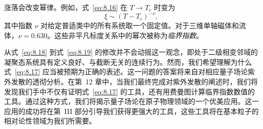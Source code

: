 涨落会改变幂律。例如，式~\eqref{eq:8.16} 在 $T \to T_c$ 时变为
\begin{equation}
  \xi \sim (T-T_c)^{-\nu},
  \label{eq:8.19}
\end{equation}
其中指数 $\nu$ 对给定普适类中的所有系统取一个固定值。对于三维单轴磁体和流体，$\nu = 0.630$。这些非平凡标度关系中的幂次被称为\emph{临界指数}。

从式~\eqref{eq:8.18} 到式~\eqref{eq:8.19} 的修改并不会动摇这一观念，即处于二级相变邻域的凝聚态系统具有定义良好、与截断无关的连续行为。然而，我们希望理解为什么式~\eqref{eq:8.17} 应当被预期为正确的表述。这一问题的答案将来自对相应量子场论紫外发散的透彻分析。在第~12 章中，当我们最终完成对紫外发散的阐述时，我们将发现我们手中不仅有证明式~\eqref{eq:8.17} 的工具，还有用费曼图计算临界指数数值的工具。通过这种方式，我们将揭示量子场论在原子物理领域的一个优美应用。这一应用的成功将在第~III 部分引导我们获得更强大的工具，这些工具将在基本粒子的相对论性领域为我们所需要。
